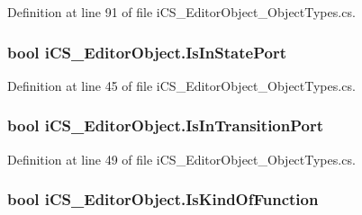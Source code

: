 Definition at line 91 of file i\+C\+S\+\_\+\+Editor\+Object\+\_\+\+Object\+Types.\+cs.

\hypertarget{classi_c_s___editor_object_acac940856bb7029f0c6a49ad120f3765}{
\subsubsection[{Is\+In\+State\+Port}]{\setlength{\rightskip}{0pt plus 5cm}bool i\+C\+S\+\_\+\+Editor\+Object.\+Is\+In\+State\+Port\hspace{0.3cm}{\ttfamily [get]}}}\label{classi_c_s___editor_object_acac940856bb7029f0c6a49ad120f3765}


Definition at line 45 of file i\+C\+S\+\_\+\+Editor\+Object\+\_\+\+Object\+Types.\+cs.

\hypertarget{classi_c_s___editor_object_aa4b2dbbbe5a687f3d40e5cf25765764e}{
\subsubsection[{Is\+In\+Transition\+Port}]{\setlength{\rightskip}{0pt plus 5cm}bool i\+C\+S\+\_\+\+Editor\+Object.\+Is\+In\+Transition\+Port\hspace{0.3cm}{\ttfamily [get]}}}\label{classi_c_s___editor_object_aa4b2dbbbe5a687f3d40e5cf25765764e}


Definition at line 49 of file i\+C\+S\+\_\+\+Editor\+Object\+\_\+\+Object\+Types.\+cs.

\hypertarget{classi_c_s___editor_object_af5afd19352e5a45be7089d3ef81d67f6}{
\subsubsection[{Is\+Kind\+Of\+Function}]{\setlength{\rightskip}{0pt plus 5cm}bool i\+C\+S\+\_\+\+Editor\+Object.\+Is\+Kind\+Of\+Function\hspace{0.3cm}{\ttfamily [get]}}}\label{classi_c_s___editor_object_af5afd19352e5a45be7089d3ef81d67f6}


